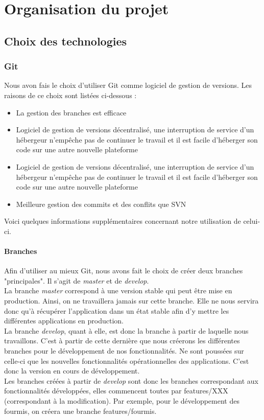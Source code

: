 \chapter{Organisation du projet}

	\section{Choix des technologies}

		\subsection{Git}

			Nous avon fais le choix d'utiliser Git comme logiciel de gestion de versions. Les raisons de ce choix sont listées ci-dessous :

			\begin{itemize}
				\item{La gestion des branches est efficace}
				\item{Logiciel de gestion de versions décentralisé, une interruption de service d'un hébergeur n'empêche pas de continuer le travail et il est facile d'héberger son code sur une autre nouvelle plateforme}
				\item{Logiciel de gestion de versions décentralisé, une interruption de service d'un hébergeur n'empêche pas de continuer le travail et il est facile d'héberger son code sur une autre nouvelle plateforme}
				\item{Meilleure gestion des commits et des conflits que SVN}
			\end{itemize}

			Voici quelques informations supplémentaires concernant notre utilisation de celui-ci.

			\subsubsection{Branches}

				Afin d'utiliser au mieux Git, nous avons fait le choix de créer deux branches "principales". Il s'agit de \textit{master} et de \textit{develop}.\\
				La branche \textit{master} correspond à une version stable qui peut être mise en production. Ainsi, on ne travaillera jamais sur cette branche. Elle ne nous servira donc qu'à récupérer l'application dans un état stable afin d'y mettre les différentes applications en production.\\
				La branche \textit{develop}, quant à elle, est donc la branche à partir de laquelle nous travaillons. C'est à partir de cette dernière que nous créerons les différentes branches pour le développement de nos fonctionnalités. Ne sont poussées sur celle-ci que les nouvelles fonctionnalités opérationnelles des applications. C'est donc la version en cours de développement.\\
				Les branches créées à partir de \textit{develop} sont donc les branches correspondant aux fonctionnalités développées, elles commencent toutes par features/XXX (correspondant à la modification). Par exemple, pour le développement des fourmis, on créera une branche features/fourmis.

